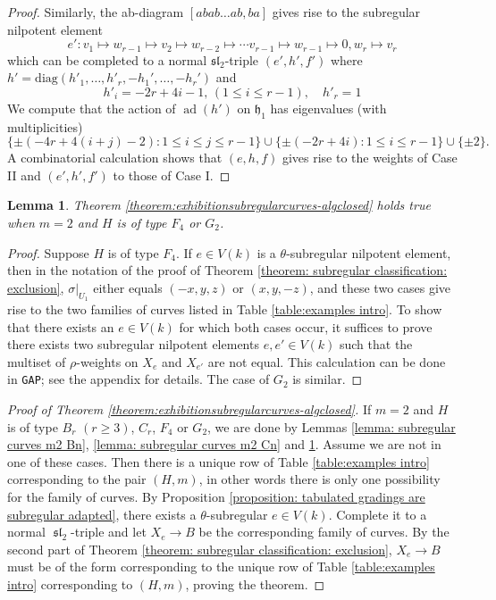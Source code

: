 \documentclass{article} %
\newtheorem{lemma}[proposition]{Lemma}
\numberwithin{equation}{section}
\theoremstyle{definition}
\DeclareMathOperator{\liesl}{\mathfrak{sl}}
\newcommand{\frakh}{\mathfrak h}
\newcommand{\fraksl}{\mathfrak{sl}}
\DeclareMathOperator{\ad}{ad}
\newcommand{\rl}{r} %
\begin{document}
\begin{proof}
Similarly, the ab-diagram $[abab\dots ab,ba]$ gives rise to the subregular nilpotent element
\[
e': v_1\mapsto w_{\rl-1}\mapsto v_2 \mapsto w_{\rl-2} \mapsto \cdots v_{\rl-1}\mapsto w_{\rl-1}\mapsto 0, w_\rl\mapsto v_\rl
\]
which can be completed to a normal $\fraksl_2$-triple $(e',h',f')$ where $h '  = \text{diag}(h'_1, \dots, h'_\rl, -h_1', \dots, -h_\rl')$ and
\[
h'_i = -2\rl+4i-1 ,\, (1\leq i \leq \rl-1), \quad h'_\rl = 1
\]
We compute that the action of $\ad(h')$ on $\frakh_1$ has eigenvalues (with multiplicities)
\[\{\pm(-4\rl + 4(i+j)-2) \colon 1\leq i\leq j\leq \rl-1  \}
\cup
\{ \pm (-2\rl+4i) \colon 1\leq i\leq \rl-1\} \cup \{\pm 2\}.\]
A combinatorial calculation shows that $(e,h,f)$ gives rise to the weights of Case II and $(e',h',f')$ to those of Case I.
\end{proof}


\begin{lemma}\label{lemma: subregular curves m2 F4 G2}
    Theorem \ref{theorem:exhibitionsubregularcurves-algclosed} holds true when $m=2$ and $H$ is of type $F_4$ or $G_2$.
\end{lemma}
\begin{proof}
    Suppose $H$ is of type $F_4$.
    If $e\in V(k)$ is a $\theta$-subregular nilpotent element, then in the notation of the proof of Theorem \ref{theorem: subregular classification: exclusion}, $\sigma|_{U_1}$ either equals $(-x,y,z)$ or $(x,y,-z)$, and these two cases give rise to the two families of curves listed in Table \ref{table:examples intro}.
    To show that there exists an $e\in V(k)$ for which both cases occur, it suffices to prove there exists two subregular nilpotent elements $e, e'\in V(k)$ such that the multiset of $\rho$-weights on $X_e$ and $X_{e'}$ are not equal. 
    This calculation can be done in \texttt{GAP}; see the appendix for details.
    The case of $G_2$ is similar.
\end{proof}



\begin{proof}[Proof of Theorem \ref{theorem:exhibitionsubregularcurves-algclosed}]
    If $m=2$ and $H$ is of type $B_{\rl}$ $(\rl\geq 3)$, $C_{\rl}$, $F_4$ or $G_2$, we are done by Lemmas \ref{lemma: subregular curves m2 Bn}, \ref{lemma: subregular curves m2 Cn} and \ref{lemma: subregular curves m2 F4 G2}.
    Assume we are not in one of these cases.
    Then there is a unique row of Table \ref{table:examples intro} corresponding to the pair $(H,m)$, in other words there is only one possibility for the family of curves.
    By Proposition \ref{proposition: tabulated gradings are subregular adapted}, there exists a $\theta$-subregular $e \in V(k)$.
    Complete it to a normal $\liesl_2$-triple and let $X_e\rightarrow B$ be the corresponding family of curves.
    By the second part of Theorem \ref{theorem: subregular classification: exclusion}, $X_e\rightarrow B$ must be of the form corresponding to the unique row of Table \ref{table:examples intro} corresponding to $(H,m)$, proving the theorem.
\end{proof}
\end{document}
